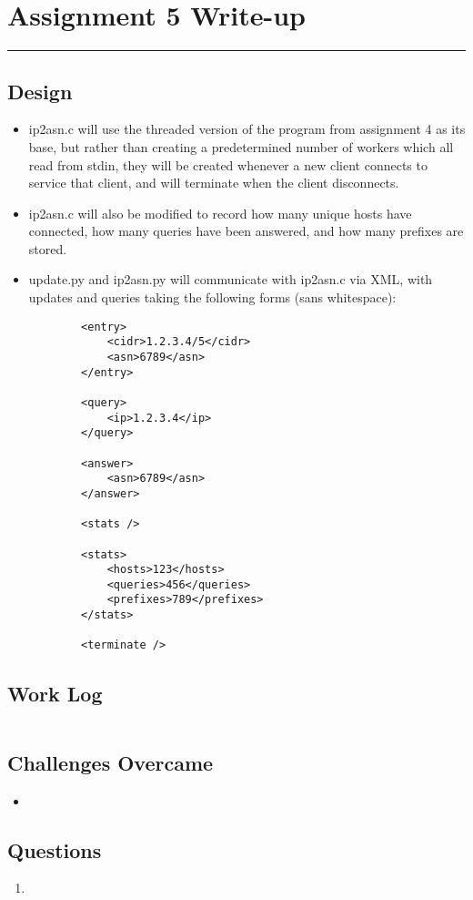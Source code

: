 \documentclass[letterpaper,10pt,fleqn]{article}
\numberwithin{equation}{section}
\begin{document}

\section*{Assignment 5 Write-up}
\hrule

\subsection*{Design}
\begin{itemize}
    \item ip2asn.c will use the threaded version of the program from assignment 4 as its base, but rather than creating a predetermined number of workers which all read from stdin, they will be created whenever a new client connects to service that client, and will terminate when the client disconnects.
    \item ip2asn.c will also be modified to record how many unique hosts have connected, how many queries have been answered, and how many prefixes are stored.
    \item update.py and ip2asn.py will communicate with ip2asn.c via XML, with updates and queries taking the following forms (sans whitespace):
    \begin{verbatim}
        <entry>
            <cidr>1.2.3.4/5</cidr>
            <asn>6789</asn>
        </entry>

        <query>
            <ip>1.2.3.4</ip>
        </query>

        <answer>
            <asn>6789</asn>
        </answer>

        <stats />

        <stats>
            <hosts>123</hosts>
            <queries>456</queries>
            <prefixes>789</prefixes>
        </stats>

        <terminate />
    \end{verbatim}
\end{itemize}

\subsection*{Work Log}
\begin{verbatim}
\end{verbatim}
\subsection*{Challenges Overcame}
\begin{itemize}
    \item
\end{itemize}

\subsection*{Questions}
\begin{enumerate}
    \item
\end{enumerate}
\end{document}
